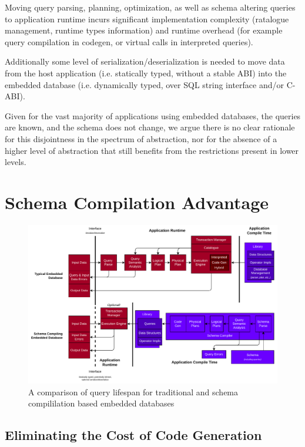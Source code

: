 \documentclass[conference]{IEEEtran}
\begin{document}
Moving query parsing, planning, optimization, as well as schema altering queries to application
runtime incurs significant implementation complexity (ratalogue management, runtime types information)
and runtime overhead (for example query compilation in codegen, or virtual calls in interpreted queries).

Additionally some level of serialization/deserialization is needed to move data from the host application
(i.e. statically typed, without a stable ABI) into the embedded database (i.e. dynamically typed, over SQL string interface and/or C-ABI).

Given for the vast majority of applications using embedded databases, the queries are known, and the schema does not change, we argue there 
is no clear rationale for this disjointness in the spectrum of abstraction, nor for the absence
of a higher level of abstraction that still benefits from the restrictions present in lower levels.

\section{Schema Compilation Advantage}

\begin{figure}[b]
    \centering
    \includegraphics[width=\textwidth]{_diagrams/query_lifespan.pdf}
    \caption{A comparison of query lifespan for traditional and schema compililation based embedded databases}
    \label{fig:query-lifespan}
\end{figure}

\subsection{Eliminating the Cost of Code Generation}
\end{document}
